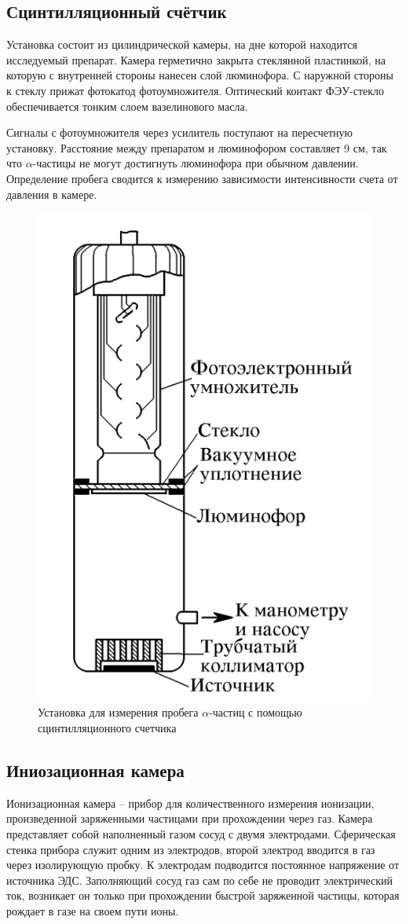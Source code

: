 \subsection{Сцинтилляционный счётчик}

    Установка состоит из цилиндрической камеры, на дне которой находится исследуемый препарат. Камера герметично закрыта стеклянной пластинкой, на которую с внутренней стороны нанесен слой люминофора. С наружной стороны к стеклу прижат фотокатод фотоумножителя. Оптический контакт ФЭУ-стекло обеспечивается тонким слоем вазелинового масла.
        
    
    Сигналы с фотоумножителя через усилитель поступают на пересчетную установку. Расстояние между препаратом и люминофором составляет 9 см, так что $\alpha$-частицы не могут достигнуть люминофора при обычном давлении. Определение пробега сводится к измерению зависимости интенсивности счета от давления в камере.

    \begin{figure}[h!]
        \centering
        \includegraphics[width = 6 cm]{images/scint}
        \caption{Установка для измерения пробега $\alpha$-частиц с помощью сцинтилляционного счетчика}
        \label{}
    \end{figure}
    
\subsection{Иниозационная камера}

    Ионизационная камера -- прибор для количественного измерения ионизации, произведенной заряженными частицами при прохождении
    через газ. Камера представляет собой наполненный газом сосуд с двумя электродами. Сферическая стенка прибора служит одним из электродов, второй электрод вводится в газ через изолирующую пробку. К электродам подводится постоянное напряжение от источника ЭДС.
    Заполняющий сосуд газ сам по себе не проводит электрический ток, возникает он только при прохождении быстрой заряженной частицы, которая
    рождает в газе на своем пути ионы.

